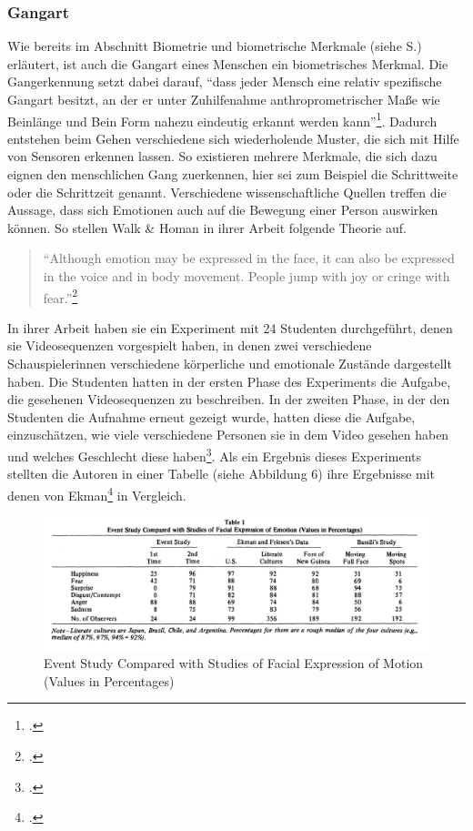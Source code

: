 \subsubsection{Gangart}
Wie bereits im Abschnitt Biometrie und biometrische Merkmale (siehe S.\pageref{section:Biometrie}) erläutert, ist auch die Gangart eines Menschen ein biometrisches Merkmal. Die Gangerkennung setzt dabei darauf, ``dass jeder Mensch eine relativ spezifische Gangart besitzt, an der er unter Zuhilfenahme anthroprometrischer Maße wie Beinlänge und Bein Form nahezu eindeutig erkannt werden kann''\footcite[siehe ][Abschnitt Allgemein Abs.2 Z.2]{Bio18}. Dadurch entstehen beim Gehen verschiedene sich wiederholende Muster, die sich mit Hilfe von Sensoren erkennen lassen. So existieren mehrere Merkmale, die sich dazu eignen den menschlichen Gang zuerkennen, hier sei zum Beispiel die Schrittweite oder die Schrittzeit genannt.\newline
Verschiedene wissenschaftliche Quellen treffen die Aussage, dass sich Emotionen auch auf die Bewegung einer Person auswirken können. So stellen Walk \& Homan in ihrer Arbeit folgende Theorie auf.
\begin{quote}
	``Although emotion may be expressed in the face, it can also be expressed in the voice and in body movement. People jump with joy or cringe with fear.''\footcite[siehe ][S.437 Z.20-23]{Wal84}
\end{quote}
In ihrer Arbeit haben sie ein Experiment mit 24 Studenten durchgeführt, denen sie Videosequenzen vorgespielt haben, in denen zwei verschiedene Schauspielerinnen verschiedene körperliche und emotionale Zustände dargestellt haben. Die Studenten hatten in der ersten Phase des Experiments die Aufgabe, die gesehenen Videosequenzen zu beschreiben. In der zweiten Phase, in der den Studenten die Aufnahme erneut gezeigt wurde, hatten diese die Aufgabe, einzuschätzen, wie viele verschiedene Personen sie in dem Video gesehen haben und welches Geschlecht diese haben\footcite[Vgl. ][S.437+438 Method]{Wal84}. Als ein Ergebnis dieses Experiments stellten die Autoren in einer Tabelle (siehe Abbildung 6) ihre Ergebnisse mit denen von Ekman\footcite{Ekm92} in Vergleich. 
\begin{figure}[h]
	\centering
	\includegraphics[width=16cm]{Bilder/Gangerkennung-Emotion-Vgl.png}
	\caption[Event Study Compared with Studies of Facial Expression of Motion (Values in Percentages)]{Event Study Compared with Studies of Facial Expression of Motion (Values in Percentages)\footnotemark}
\end{figure}
